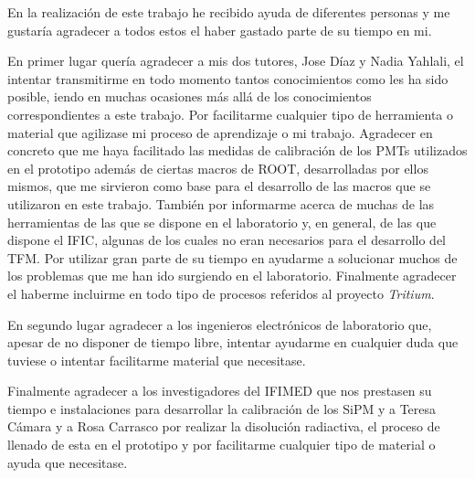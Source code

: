 En la realización de este trabajo he recibido ayuda de diferentes personas y me gustaría agradecer a todos estos el haber gastado parte de su tiempo en mi.

En primer lugar quería agradecer a mis dos tutores, Jose Díaz y Nadia Yahlali, el intentar transmitirme en todo momento tantos conocimientos como les ha sido posible, iendo en muchas ocasiones más allá de los conocimientos correspondientes a este trabajo. Por facilitarme cualquier tipo de herramienta o material que agilizase mi proceso de aprendizaje o mi trabajo. Agradecer en concreto que me haya facilitado las medidas de calibración de los PMTs utilizados en el prototipo además de ciertas macros de ROOT, desarrolladas por ellos mismos, que me sirvieron como base para el desarrollo de las macros que se utilizaron en este trabajo. También por informarme acerca de muchas de las herramientas de las que se dispone en el laboratorio y, en general, de las que dispone el IFIC, algunas de los cuales no eran necesarios para el desarrollo del TFM. Por utilizar gran parte de su tiempo en ayudarme a solucionar muchos de los problemas que me han ido surgiendo en el laboratorio. Finalmente agradecer el haberme incluirme en todo tipo de procesos referidos al proyecto \textit{Tritium}. 

En segundo lugar agradecer a los ingenieros electrónicos de laboratorio que, apesar de no disponer de tiempo libre, intentar ayudarme en cualquier duda que tuviese o intentar facilitarme material que necesitase.

Finalmente agradecer a los investigadores del IFIMED que nos prestasen su tiempo e instalaciones para desarrollar la calibración de los SiPM  y a Teresa Cámara y a Rosa Carrasco por realizar la disolución radiactiva, el proceso de llenado de esta en el prototipo y por facilitarme cualquier tipo de material o ayuda que necesitase.